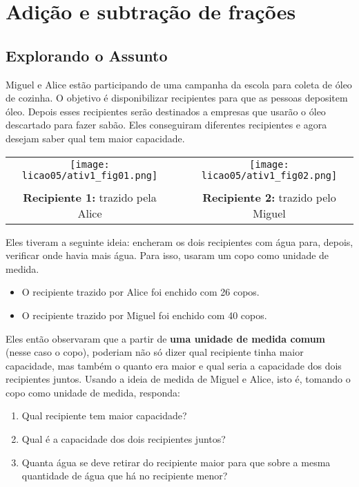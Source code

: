 
\chapter{Adição e subtração de frações}

\section{Explorando o Assunto}

\begin{atividade}{}\label{chap5-ativ1}


Miguel e Alice estão participando de uma campanha da escola para coleta de óleo de cozinha. O objetivo é disponibilizar recipientes para que as pessoas depositem óleo. Depois esses recipientes serão destinados a empresas que usarão o óleo descartado para fazer sabão. Eles conseguiram diferentes recipientes e agora desejam saber qual tem maior capacidade.

\begin{center}
\begin{tabular}{ccc}
\texttt{[image: licao05/ativ1\_fig01.png]} &\quad \quad&\texttt{[image: licao05/ativ1\_fig02.png]}\\ \\
{\bfseries Recipiente 1:} trazido pela Alice & & {\bfseries Recipiente 2:} trazido pelo Miguel
\end{tabular}
\end{center}
\vspace{.2cm}

Eles tiveram a seguinte ideia: encheram os dois recipientes com água para, depois, verificar onde havia mais água. Para isso, usaram um copo como unidade de medida.
\begin{itemize}
 \item O recipiente trazido por Alice foi enchido com 26 copos.
 \item O recipiente trazido por Miguel foi enchido com 40 copos.
\end{itemize}
Eles então observaram que a partir de {\bfseries uma unidade de medida comum} \linebreak (nesse caso o copo), poderiam não só dizer qual recipiente tinha maior capacidade, mas também o quanto era maior e qual seria a capacidade dos dois recipientes juntos.
Usando a ideia de medida de Miguel e Alice, isto é, tomando o copo como unidade de medida, responda:
  \begin{enumerate}
   \item Qual recipiente tem maior capacidade?
   \item Qual é a capacidade dos dois recipientes juntos?
   \item Quanta água se deve retirar do recipiente maior para que sobre a mesma quantidade de água que há no recipiente menor?
  \end{enumerate}
\end{atividade}

